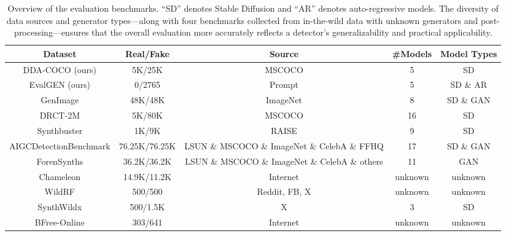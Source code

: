 \documentclass{article}
\begin{document}
\begin{table}[t!]
  \caption{Overview of the evaluation benchmarks. “SD” denotes Stable Diffusion and “AR” denotes auto-regressive models. The diversity of data sources and generator types—along with four benchmarks collected from in-the-wild data with unknown generators and post-processing—ensures that the overall evaluation more accurately reflects a detector’s generalizability and practical applicability.}
  \label{tab:dataset-overview}
  \centering
  \begin{adjustbox}{width=0.85\linewidth}
    \begin{tabular}{ccccc}
      \toprule
      Dataset & Real/Fake & Source & \#Models & Model Types \\
      \midrule
      DDA-COCO (ours) & 5K/25K & MSCOCO & 5 & SD \\
      EvalGEN (ours) & 0/2765 & Prompt & 5 & SD \& AR \\
      GenImage \cite{zhu2023genimage} & 48K/48K & ImageNet & 8 & SD \& GAN \\
      DRCT-2M \cite{chen2024drct} & 5K/80K & MSCOCO & 16 & SD \\
      Synthbuster \cite{bammey2023synthbuster} & 1K/9K & RAISE & 9 & SD \\
      AIGCDetectionBenchmark \cite{zhong2024patchcraft} & 76.25K/76.25K & LSUN \& MSCOCO \& ImageNet \& CelebA \& FFHQ & 17 & SD \& GAN \\
      ForenSynths \cite{wang2020cnn2} & 36.2K/36.2K & LSUN \& MSCOCO \& ImageNet \& CelebA \& others & 11 & GAN\\
      Chameleon \cite{yan2024sanity} & 14.9K/11.2K & Internet & unknown & unknown \\
      WildRF \cite{cavia2024real} & 500/500 & Reddit, FB, X & unknown & unknown \\
      SynthWildx \cite{cozzolino2024raising} & 500/1.5K & X & 3 & SD \\
      BFree-Online \cite{guillaro2024bias} & 303/641 & Internet & unknown & unknown \\
      \bottomrule
    \end{tabular}
  \end{adjustbox}
  \vspace{-10pt}
\end{table}
\end{document}
